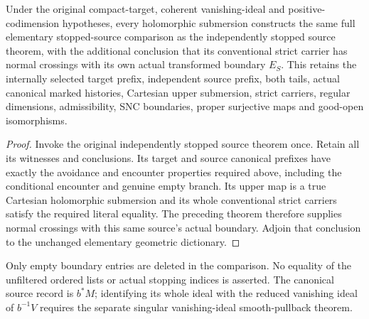 \begin{theorem}
\label{hir:original-independent-embedded-smooth-own-boundary}
\leanok
Under the original compact-target, coherent vanishing-ideal and
positive-codimension hypotheses, every holomorphic submersion constructs
the same full elementary stopped-source comparison as the independently
stopped source theorem, with the additional conclusion that its
conventional strict carrier has normal crossings with its own actual
transformed boundary $E_S$.  This retains the internally selected
target prefix, independent source prefix, both tails, actual canonical
marked histories, Cartesian upper submersion, strict carriers, regular
dimensions, admissibility, SNC boundaries, proper surjective maps and
good-open isomorphisms.
\end{theorem}
\begin{proof}
Invoke the original independently stopped source theorem once.  Retain
all its witnesses and conclusions.  Its target and source canonical
prefixes have exactly the avoidance and encounter properties required
above, including the conditional encounter and genuine empty branch.
Its upper map is a true Cartesian holomorphic submersion and its whole
conventional strict carriers satisfy the required literal equality.
The preceding theorem therefore supplies normal crossings with this
same source's actual boundary.  Adjoin that conclusion to the unchanged
elementary geometric dictionary.
\end{proof}

\begin{remark}
Only empty boundary entries are deleted in the comparison.  No equality
of the unfiltered ordered lists or actual stopping indices is asserted.
The canonical source record is $b^*M$; identifying its whole ideal with
the reduced vanishing ideal of $b^{-1}V$ requires the separate singular
vanishing-ideal smooth-pullback theorem.
\end{remark}
